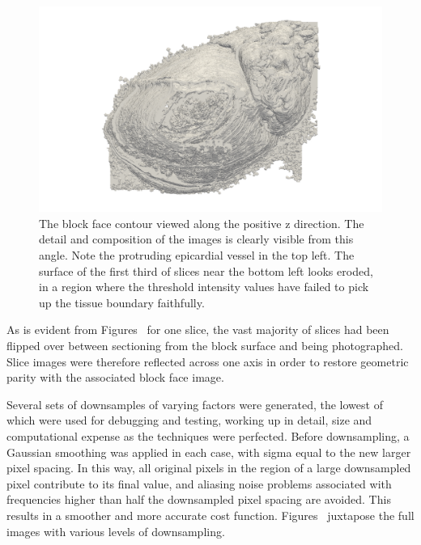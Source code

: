     \begin{figure}
      \centering
      \includegraphics[width=\textheight]{Ch5/Figs/Rat28/contours/LoRes_positive_z}
      \caption{The block face contour viewed along the positive z direction. The detail and composition of the images is clearly visible from this angle. Note the protruding epicardial vessel in the top left. The surface of the first third of slices near the bottom left looks eroded, in a region where the threshold intensity values have failed to pick up the tissue boundary faithfully.}
      \label{fig:LoRes_positive_z}
    \end{figure}
    
	As is evident from Figures~ for one slice, the vast majority of slices had been flipped over between sectioning from the block surface and being photographed. Slice images were therefore reflected across one axis in order to restore geometric parity with the associated block face image.
	
	 Several sets of downsamples of varying factors were generated, the lowest of which were used for debugging and testing, working up in detail, size and computational expense as the techniques were perfected. Before downsampling, a Gaussian smoothing was applied in each case, with sigma equal to the new larger pixel spacing. In this way, all original pixels in the region of a large downsampled pixel contribute to its final value, and aliasing noise problems associated with frequencies higher than half the downsampled pixel spacing are avoided. This results in a smoother and more accurate cost function. Figures~ juxtapose the full images with various levels of downsampling.
	 

